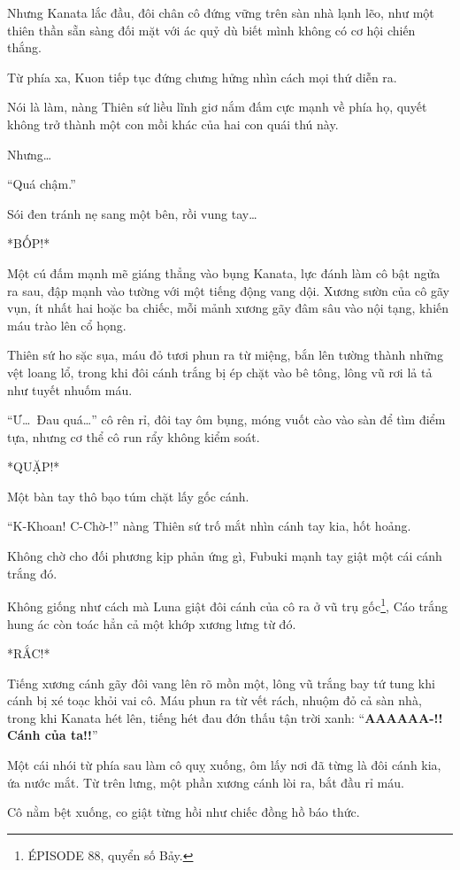 \documentclass[../main.tex]{subfiles}
\begin{document}
Nhưng Kanata lắc đầu, đôi chân cô đứng vững trên sàn nhà lạnh lẽo, như một thiên thần sẵn sàng đối mặt với ác quỷ dù biết mình không có cơ hội chiến thắng.

Từ phía xa, Kuon tiếp tục đứng chưng hửng nhìn cách mọi thứ diễn ra.

Nói là làm, nàng Thiên sứ liều lĩnh giơ nắm đấm cực mạnh về phía họ, quyết không trở thành một con mồi khác của hai con quái thú này.

Nhưng\dots

``Quá chậm.''

Sói đen tránh nẹ sang một bên, rồi vung tay\dots

*BỐP!*

Một cú đấm mạnh mẽ giáng thẳng vào bụng Kanata, lực đánh làm cô bật ngửa ra sau, đập mạnh vào tường với một tiếng động vang dội. Xương sườn của cô gãy vụn, ít nhất hai hoặc ba chiếc, mỗi mảnh xương gãy đâm sâu vào nội tạng, khiến máu trào lên cổ họng.

Thiên sứ ho sặc sụa, máu đỏ tươi phun ra từ miệng, bắn lên tường thành những vệt loang lổ, trong khi đôi cánh trắng bị ép chặt vào bê tông, lông vũ rơi lả tả như tuyết nhuốm máu.

``Ư\dots\ Đau quá\dots'' cô rên rỉ, đôi tay ôm bụng, móng vuốt cào vào sàn để tìm điểm tựa, nhưng cơ thể cô run rẩy không kiểm soát.

*QUẶP!*

Một bàn tay thô bạo túm chặt lấy gốc cánh.

``K-Khoan! C-Chờ-!'' nàng Thiên sứ trố mắt nhìn cánh tay kia, hốt hoảng.

Không chờ cho đối phương kịp phản ứng gì, Fubuki mạnh tay giật một cái cánh trắng đó.

Không giống như cách mà Luna giật đôi cánh của cô ra ở vũ trụ gốc\footnote{{\flaregothic ÉPISODE 88}, quyển số Bảy.}, Cáo trắng hung ác còn toác hẳn cả một khớp xương lưng từ đó.

*RẮC!*

Tiếng xương cánh gãy đôi vang lên rõ mồn một, lông vũ trắng bay tứ tung khi cánh bị xé toạc khỏi vai cô. Máu phun ra từ vết rách, nhuộm đỏ cả sàn nhà, trong khi Kanata hét lên, tiếng hét đau đớn thấu tận trời xanh: ``\textbf{AAAAAA-!! Cánh của ta!!}''

Một cái nhói từ phía sau làm cô quỵ xuống, ôm lấy nơi đã từng là đôi cánh kia, ứa nước mắt. Từ trên lưng, một phần xương cánh lòi ra, bắt đầu rỉ máu.

Cô nằm bệt xuống, co giật từng hồi như chiếc đồng hồ báo thức.
\end{document}
